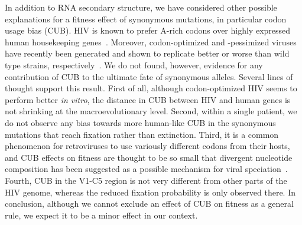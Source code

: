 \documentclass[rmp, twocolumn]{revtex4}
\begin{document}
In addition to RNA secondary structure, we have considered other possible
explanations for a fitness effect of synonymous mutations, in particular codon
usage bias (CUB). HIV is known to prefer A-rich codons over highly expressed
human housekeeping genes~\citep{jenkins_extent_2003}. Moreover, codon-optimized
and -pessimized viruses have recently been generated and shown to replicate
better or worse than wild type strains,
respectively~\citep{li_codon-usage-based_2012, ngumbela_quantitative_2008,
coleman_virus_2008}. We do not found, however, evidence for any contribution of
CUB to the ultimate fate of synonymous alleles. Several lines of thought support
this result. First of all, although codon-optimized HIV seems to perform better
{\it in vitro}, the distance in CUB between HIV and human genes is not shrinking
at the macroevolutionary level. Second, within a single patient, we do not
observe any bias towards more human-like CUB in the synonymous mutations that
reach fixation rather than extinction. Third, it is a common phenomenon for
retroviruses to use variously different codons from their hosts, and CUB effects
on fitness are thought to be so small that divergent nucleotide composition has
been suggested as a possible mechanism for viral
speciation~\citep{bronson_nucleotide_1994}. Fourth, CUB in the V1-C5 region is
not very different from other parts of the HIV genome, whereas the reduced
fixation probability is only observed there. In conclusion, although we cannot
exclude an effect of CUB on fitness as a general rule, we expect it to be a
minor effect in our context.
\end{document}
